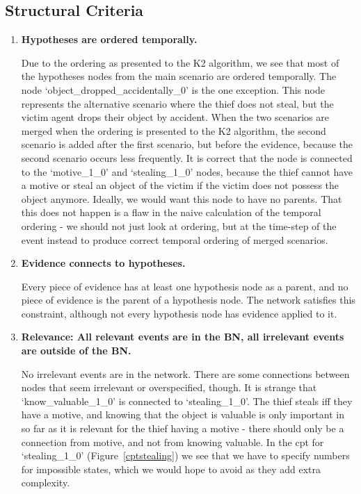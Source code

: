 \subsection{Structural Criteria}
\begin{enumerate}
\item \textbf{ Hypotheses are ordered temporally. }

Due to the ordering as presented to the K2 algorithm, we see that most of the hypotheses nodes from the main scenario are ordered temporally. The node `object\_dropped\_accidentally\_0' is the one exception. This node represents the alternative scenario where the thief does not steal, but the victim agent drops their object by accident. When the two scenarios are merged when the ordering is presented to the K2 algorithm, the second scenario is added after the first scenario, but before the evidence, because the second scenario occurs less frequently. It is correct that the node is connected to the `motive\_1\_0'  and `stealing\_1\_0' nodes, because the thief cannot have a motive or steal an object of the victim if the victim does not possess the object anymore. Ideally, we would want this node to have no parents. That this does not happen is a flaw in the naive calculation of the temporal ordering - we should not just look at ordering, but at the time-step of the event instead to produce correct temporal ordering of merged scenarios.

\item \textbf{Evidence connects to hypotheses.}

Every piece of evidence has at least one hypothesis node as a parent, and no piece of evidence is the parent of a hypothesis node. The network satisfies this constraint, although not every hypothesis node has evidence applied to it.

\item \textbf{Relevance: All relevant events are in the BN, all irrelevant events are outside of the BN.}

No irrelevant events are in the network. There are some connections between nodes that seem irrelevant or overspecified, though. It is strange that `know\_valuable\_1\_0' is connected to `stealing\_1\_0'. The thief steals iff they have a motive, and knowing that the object is valuable is only important in so far as it is relevant for the thief having a motive - there should only be a connection from motive, and not from knowing valuable. In the cpt for `stealing\_1\_0' (Figure~\ref{cptstealing}) we see that we have to specify numbers for impossible states, which we would hope to avoid as they add extra complexity.


\end{enumerate}
